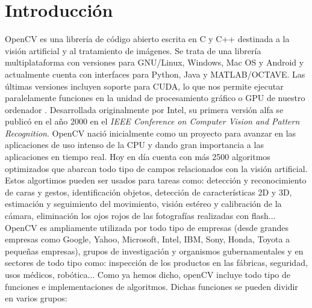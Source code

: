 \documentclass[a4paper,openright, 12pt]{book}
\begin{document}
\section{Introducción}
OpenCV es una librería de código abierto escrita en C y C++ destinada a la visión artificial y al tratamiento de imágenes. Se trata de una librería multiplataforma con versiones para GNU/Linux, Windows, Mac OS y Android y actualmente cuenta con interfaces para Python, Java y MATLAB/OCTAVE. Las últimas versiones incluyen soporte para CUDA, lo que nos permite ejecutar paralelamente funciones en la unidad de procesamiento gráfico o GPU de nuestro ordenador .
Desarrollada originalmente por Intel, su primera versión alfa se publicó en el año 2000 en el \textit{IEEE Conference on Computer Vision and Pattern Recognition}. OpenCV nació inicialmente como un proyecto para avanzar en las aplicaciones de uso intenso de la CPU y dando gran importancia a las aplicaciones en tiempo real. Hoy en día cuenta con más 2500 algoritmos optimizados que abarcan todo tipo de campos relacionados con la visión artificial.
Estos algortimos pueden ser usados para tareas como: detección y reconocimiento de caras y gestos, identificación objetos, detección de características 2D y 3D, estimación y seguimiento del movimiento, visión estéreo y calibración de la cámara, eliminación los ojos rojos de las fotografías realizadas con flash...
\newline
OpenCV es ampliamente utilizada por todo tipo de empresas (desde grandes empresas como Google, Yahoo, Microsoft, Intel, IBM, Sony, Honda, Toyota a pequeñas empresas), grupos de investigación y organismos gubernamentales y en sectores de todo tipo como: inspección de los productos en las fábricas, seguridad, usos médicos, robótica...
\newline
Como ya hemos dicho, openCV incluye todo tipo de funciones e implementaciones de algoritmos. 
Dichas funciones se pueden dividir en varios grupos:
\end{document}
